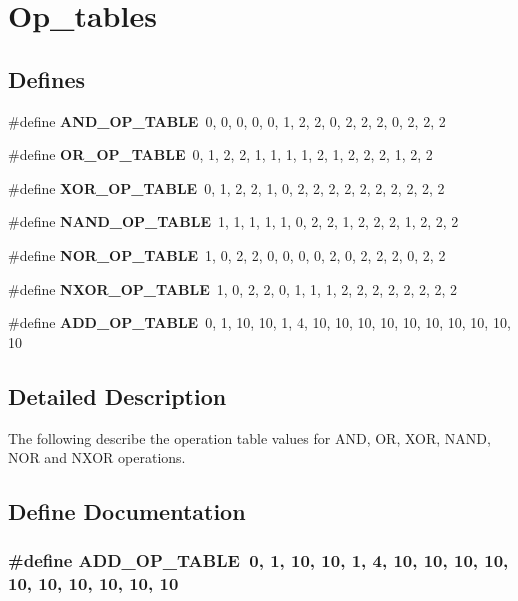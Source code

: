 \section{Op\_\-tables}
\label{group__op__tables}
\subsection*{Defines}
\begin{CompactItemize}
\item 
\#define {\bf AND\_\-OP\_\-TABLE}\ 0,  0,  0,  0,  0,  1,  2,  2,  0,  2,  2,  2,  0,  2,  2,  2
\item 
\#define {\bf OR\_\-OP\_\-TABLE}\ 0,  1,  2,  2,  1,  1,  1,  1,  2,  1,  2,  2,  2,  1,  2,  2
\item 
\#define {\bf XOR\_\-OP\_\-TABLE}\ 0,  1,  2,  2,  1,  0,  2,  2,  2,  2,  2,  2,  2,  2,  2,  2
\item 
\#define {\bf NAND\_\-OP\_\-TABLE}\ 1,  1,  1,  1,  1,  0,  2,  2,  1,  2,  2,  2,  1,  2,  2,  2
\item 
\#define {\bf NOR\_\-OP\_\-TABLE}\ 1,  0,  2,  2,  0,  0,  0,  0,  2,  0,  2,  2,  2,  0,  2,  2
\item 
\#define {\bf NXOR\_\-OP\_\-TABLE}\ 1,  0,  2,  2,  0,  1,  1,  1,  2,  2,  2,  2,  2,  2,  2,  2
\item 
\#define {\bf ADD\_\-OP\_\-TABLE}\ 0,  1,  10, 10, 1,  4,  10, 10, 10, 10, 10, 10, 10, 10, 10, 10
\end{CompactItemize}


\subsection{Detailed Description}
The following describe the operation table values for AND, OR, XOR, NAND, NOR and NXOR operations. 

\subsection{Define Documentation}
\subsubsection{\setlength{\rightskip}{0pt plus 5cm}\#define ADD\_\-OP\_\-TABLE\ 0,  1,  10, 10, 1,  4,  10, 10, 10, 10, 10, 10, 10, 10, 10, 10}\label{group__op__tables_a6}


